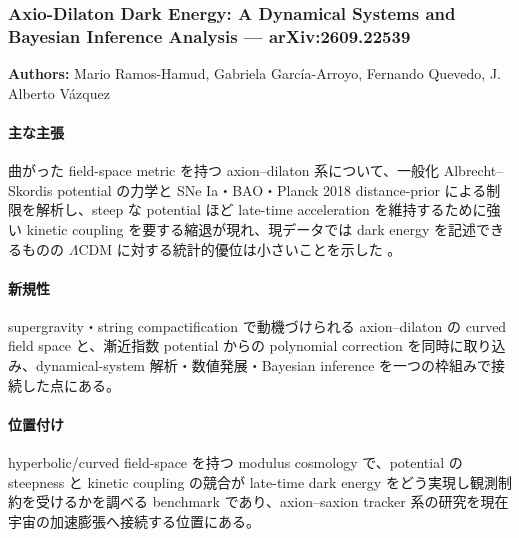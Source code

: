 \subsubsection{Axio-Dilaton Dark Energy: A Dynamical Systems and Bayesian Inference Analysis --- arXiv:2609.22539}

\textbf{Authors:} Mario Ramos-Hamud, Gabriela García-Arroyo, Fernando Quevedo, J. Alberto Vázquez

\paragraph{主な主張}
曲がった field-space metric を持つ axion--dilaton 系について、一般化 Albrecht--Skordis potential の力学と SNe Ia・BAO・Planck 2018 distance-prior による制限を解析し、steep な potential ほど late-time acceleration を維持するために強い kinetic coupling を要する縮退が現れ、現データでは dark energy を記述できるものの $\Lambda$CDM に対する統計的優位は小さいことを示した \cite{RamosHamud:2026axiodilaton}。

\paragraph{新規性}
supergravity・string compactification で動機づけられる axion--dilaton の curved field space と、漸近指数 potential からの polynomial correction を同時に取り込み、dynamical-system 解析・数値発展・Bayesian inference を一つの枠組みで接続した点にある。

\paragraph{位置付け}
hyperbolic/curved field-space を持つ modulus cosmology で、potential の steepness と kinetic coupling の競合が late-time dark energy をどう実現し観測制約を受けるかを調べる benchmark であり、axion--saxion tracker 系の研究を現在宇宙の加速膨張へ接続する位置にある。
